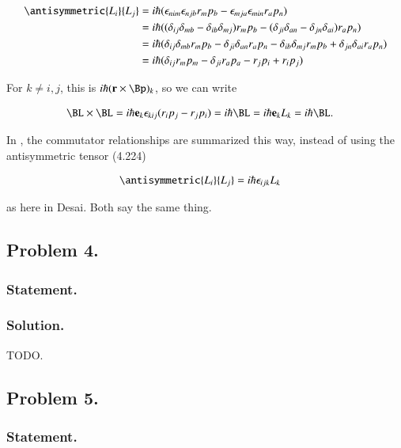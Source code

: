 \begin{align*}
\antisymmetric{L_i}{L_j}
&=
i \hbar ( \epsilon_{nim} \epsilon_{njb} r_m p_b - \epsilon_{mja} \epsilon_{min} r_a p_n ) \\
&=
i \hbar ( (\delta_{ij} \delta_{mb} -\delta_{ib} \delta_{mj}) r_m p_b - (\delta_{ji} \delta_{an} -\delta_{jn} \delta_{ai}) r_a p_n ) \\
&=
i \hbar (\delta_{ij} \delta_{mb} r_m p_b - \delta_{ji} \delta_{an} r_a p_n - \delta_{ib} \delta_{mj} r_m p_b + \delta_{jn} \delta_{ai} r_a p_n ) \\
&=
i \hbar (
\delta_{ij} r_m p_m
- \delta_{ji} r_a p_a
- r_j p_i
+ r_i p_j ) \\
\end{align*}

For $k \ne i,j$, this is $i\hbar (\Br \cross \Bp)_k$, so we can write

\begin{align}\label{eqn:desaiCh4:301}
\BL \cross \BL &= i\hbar \Be_k \epsilon_{kij} ( r_i p_j - r_j p_i ) = i\hbar \BL = i\hbar \Be_k L_k = i\hbar \BL.
\end{align}

In \cite{liboff2003iqm}, the commutator relationships are summarized this way, instead of using the antisymmetric tensor (4.224)

\begin{align}\label{eqn:desaiCh4:302}
\antisymmetric{L_i}{L_j} &= i \hbar \epsilon_{ijk} L_k
\end{align}

as here in Desai.  Both say the same thing.

\subsection{Problem 4.}
\subsubsection{Statement.}
\subsubsection{Solution.}

TODO.
\subsection{Problem 5.}
\subsubsection{Statement.}

